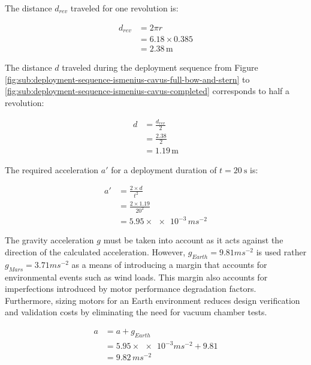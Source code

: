 \vspace{0.25cm}

The distance $d_{rev}$ traveled for one revolution is:

\begin{align}
  \label{eq:solar-panel-deployment-revolution}
  d_{rev} &= 2\pi r\\
          &= 6.18 \times 0.385\\
          &= 2.38\,\si{\meter}
\end{align}

The distance $d$ traveled during the deployment sequence from Figure \ref{fig:sub:deployment-sequence-ismenius-cavus-full-bow-and-stern} to \ref{fig:sub:deployment-sequence-ismenius-cavus-completed} corresponds to half a revolution:

\begin{align}
  \label{eq:solar-panel-deployment-distance}
  d &= \frac{d_{rev}}{2}\\
    &= \frac{2.38}{2}\\
    &= 1.19\,\si{\meter}
\end{align}

The required acceleration $a'$ for a deployment duration of $t = \SI{20}{\second}$ is:

\begin{align}
  \label{eq:solar-panel-deployment-acceleration1}
  a' &= \frac{2 \times d}{t^{2}}\\
    &= \frac{2 \times 1.19}{20^{2}}\\
    &= 5.95\times\num{e-3}\,\si{ms^{-2}}
\end{align}

The gravity acceleration $g$ must be taken into account as it acts against the direction of the calculated acceleration. However, $g_{Earth} = 9.81 \si{ms^{-2}}$ is used rather $g_{Mars} = 3.71 \si{ms^{-2}}$ as a means of introducing a margin that accounts for environmental events such as wind loads. This margin also accounts for imperfections introduced by motor performance degradation factors. Furthermore, sizing motors for an Earth environment reduces design verification and validation costs by eliminating the need for vacuum chamber tests.

\begin{align}
  \label{eq:solar-panel-deployment-acceleration2}
  a &= a + g_{Earth}\\
    &= 5.95\times\num{e-3}\si{ms^{-2}} + 9.81\\
    &= 9.82\,\si{ms^{-2}}
\end{align}

